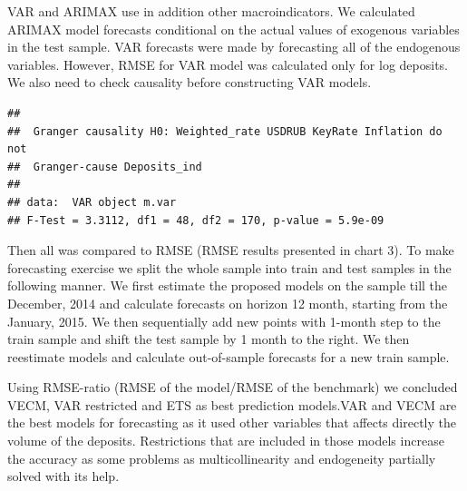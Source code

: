 \documentclass[
]{article}
\begin{document}
VAR and ARIMAX use in addition other macroindicators. We calculated
ARIMAX model forecasts conditional on the actual values of exogenous
variables in the test sample. VAR forecasts were made by forecasting all
of the endogenous variables. However, RMSE for VAR model was calculated
only for log deposits. We also need to check causality before
constructing VAR models.

\begin{verbatim}
## 
##  Granger causality H0: Weighted_rate USDRUB KeyRate Inflation do not
##  Granger-cause Deposits_ind
## 
## data:  VAR object m.var
## F-Test = 3.3112, df1 = 48, df2 = 170, p-value = 5.9e-09
\end{verbatim}

Then all was compared to RMSE (RMSE results presented in chart 3). To
make forecasting exercise we split the whole sample into train and test
samples in the following manner. We first estimate the proposed models
on the sample till the December, 2014 and calculate forecasts on horizon
12 month, starting from the January, 2015. We then sequentially add new
points with 1-month step to the train sample and shift the test sample
by 1 month to the right. We then reestimate models and calculate
out-of-sample forecasts for a new train sample.

Using RMSE-ratio (RMSE of the model/RMSE of the benchmark) we concluded
VECM, VAR restricted and ETS as best prediction models.VAR and VECM are
the best models for forecasting as it used other variables that affects
directly the volume of the deposits. Restrictions that are included in
those models increase the accuracy as some problems as multicollinearity
and endogeneity partially solved with its help.
\end{document}
